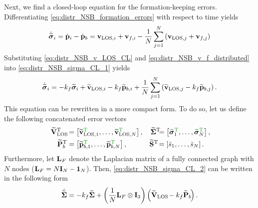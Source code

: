 Next, we find a closed-loop equation for the formation-keeping errors.
Differentiating \eqref{eq:distr_NSB_formation_errors} with respect to time yields
\begin{equation}
    \dot{\widetilde{\bm{\sigma}}}_i = \dot{\mathbf{p}}_i - \dot{\mathbf{p}}_b = \mathbf{v}_{{\rm LOS}, i} + \mathbf{v}_{f, i} - \frac{1}{N}\sum_{j=1}^N \left(\mathbf{v}_{{\rm LOS}, j} + \mathbf{v}_{f, j}\right)
    \label{eq:distr_NSB_sigma_CL_1}
\end{equation}
Substituting \eqref{eq:distr_NSB_v_LOS_CL} and \eqref{eq:distr_NSB_v_f_distributed} into \eqref{eq:distr_NSB_sigma_CL_1} yields
\begin{equation}
    \dot{\widetilde{\bm{\sigma}}}_i = -k_f \widetilde{\bm{\sigma}}_i + \widetilde{\mathbf{v}}_{{\rm LOS}, i} - k_f \widetilde{\mathbf{p}}_{b, i} + \frac{1}{N}\sum_{j=1}^N \left(\widetilde{\mathbf{v}}_{{\rm LOS}, j} - k_f \widetilde{\mathbf{p}}_{b, j}\right).
    \label{eq:distr_NSB_sigma_CL_2}
\end{equation}
This equation can be rewritten in a more compact form.
To do so, let us define the following concatenated error vectors
\begin{subequations}
    \begin{align}
        \widetilde{\mat{V}}_{\rm LOS\!}\T &= \left[\widetilde{\ivel}_{{\rm LOS}, 1}^{\dm{\rm T}}, \ldots, \widetilde{\ivel}_{{\rm LOS}, N}^{\dm{\rm T}}\right], &
        \widetilde{\bs{\Sigma}}\T\!\!\! &= \left[\widetilde{\bs{\sigma}}_1^{\dm{\rm T}}, \ldots, \widetilde{\bs{\sigma}}_N^{\dm{\rm T}}\right]\mathrlap{,} \\
        \widetilde{\mat{P}}_{b\!}\T &= \left[\widetilde{\mat{p}}_{b, 1}^{\dm{\rm T}}, \ldots, \widetilde{\mat{p}}_{b, N}^{\dm{\rm T}}\right], &
        \widetilde{\mat{S}}\T\! &= \left[\Tilde{s}_1, \ldots, \Tilde{s}_N\right].
    \end{align}
\end{subequations}
Furthermore, let $\mathbf{L}_{F}$ denote the Laplacian matrix of a fully connected graph with $N$ nodes
($
    \mathbf{L}_{F} = N \mathbf{I}_N - \mathbf{1}_N
$).
Then, \eqref{eq:distr_NSB_sigma_CL_2} can be written in the following form
\begin{equation}
    \dot{\widetilde{\bm{\Sigma}}} = - k_f \widetilde{\bm{\Sigma}} + \left(\frac{1}{N}\mathbf{L}_{F} \otimes \mathbf{I}_3\right) \left(\widetilde{\mathbf{V}}_{\rm LOS\!} - k_f \widetilde{\mathbf{P}}_{b\!} \right).
    \label{eq:distr_NSB_sigma_CL}
\end{equation}

